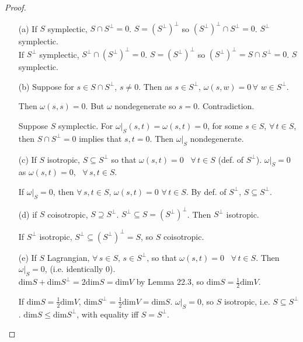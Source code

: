 
\begin{proof}
\begin{enumerate}
  \item[(a)] If $S$ symplectic, $S \cap S^{\perp} = 0$.  $S=(S^{\perp})^{\perp}$ so $(S^{\perp})^{\perp} \cap S^{\perp} =0$.  $S^{\perp}$ symplectic.  \\
If $S^{\perp}$ symplectic, $S^{\perp} \cap (S^{\perp})^{\perp} = 0$.  $S=(S^{\perp})^{\perp}$ so $(S^{\perp})^{\perp} =S \cap S^{\perp} =0$.  $S$ symplectic.  \\
  \item[(b)] Suppose for $s\in S\cap S^{\perp}$, $s\neq 0$.  Then as $s\in S^{\perp}$, $\omega(s,w)=0 \, \forall \, \, w \in S^{\perp}$. 

Then $\omega(s,s)=0$.  But $\omega$ nondegenerate so $s=0$.  Contradiction.  

Suppose $S$ symplectic.  For $\left. \omega \right|_S(s,t) = \omega(s,t)=0$, for some $s \in S$, $\forall \, t \in S$, then $S\cap S^{\perp}=0$ implies that $s,t=0$.  Then $\left. \omega \right|_S$ nondegenerate.  


  \item[(c)] If $S$ isotropic, $S\subseteq S^{\perp}$ so that $\omega(s,t)=0$ \, $\forall \, t \in S$ (def. of $S^{\perp}$).  $\left. \omega \right|_S =0$ as $\omega(s,t)=0$, \, $\forall \, s,t \in S$.  

If $\left. \omega \right|_S =0$, then $\forall \, s,t \in S$, $\omega(s,t)=0 \, \, \forall \, t\in S$.  By def. of $S^{\perp}$, $S\subseteq S^{\perp}$.  
  \item[(d)] if $S$ coisotropic, $S\supseteq S^{\perp}$.  $S^{\perp} \subseteq S=(S^{\perp})^{\perp}$.  Then $S^{\perp}$ isotropic.  

If $S^{\perp}$ isotropic, $S^{\perp} \subseteq (S^{\perp})^{\perp} = S$, so $S$ coisotropic.  
  \item[(e)] If $S$ Lagrangian, $\forall \, s \in S$, $s\in S^{\perp}$, so that $\omega(s,t) = 0$ \, $\forall \, t \in S$.  Then $\left. \omega \right|_S =0$, (i.e. identically $0$).  \\

$\text{dim}S + \text{dim}S^{\perp} = 2\text{dim}S = \text{dim}V $ by Lemma 22.3, so $\text{dim}S = \frac{1}{2} \text{dim}V$.  

If $\text{dim}S = \frac{1}{2} \text{dim}V$, $\text{dim}S^{\perp} = \frac{1}{2} \text{dim}V = \text{dim}S$.  $\left. \omega \right|_S =0$, so $S$ isotropic, i.e. $S\subseteq S^{\perp}$.  $\text{dim}S \leq \text{dim}S^{\perp}$, with equality iff $S=S^{\perp}$.  
\end{enumerate}
\end{proof}



